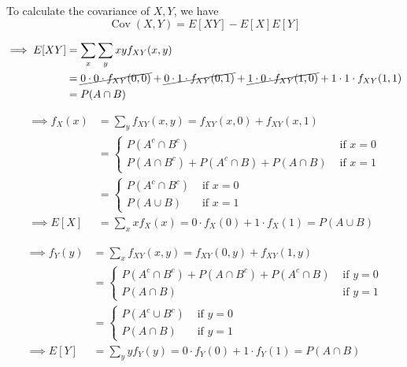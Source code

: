 To calculate the covariance of \( X, Y \), we have
\begin{equation*}
    \operatorname{Cov}(X, Y) = E[XY] - E[X]E[Y]
\end{equation*}

\begin{align*}
    \implies
    E[XY]
     & =
    \sum_{x} \sum_{y} xy f_{XY}(x, y)
    \\ & =
    \cancel{0 \cdot 0 \cdot f_{XY}(0, 0)}
    + \cancel{0 \cdot 1 \cdot f_{XY}(0, 1)}
    + \cancel{1 \cdot 0 \cdot f_{XY}(1, 0)}
    + 1 \cdot 1 \cdot f_{XY}(1, 1)
    \\ & =
    P(A \cap B)
\end{align*}

\begin{align*}
    \implies
    f_X (x)
     & =
    \sum_{y} f_{XY}(x, y)
    =
    f_{XY}(x, 0)
    + f_{XY}(x, 1)
    \\ & =
    \begin{cases}
        P(A^{c} \cap B^{c})
         &
        \text { if } x=0
        \\
        P(A \cap B^{c})
        + P(A^{c} \cap B)
        + P(A \cap B)
         &
        \text { if } x=1
    \end{cases}
    \\ & =
    \begin{cases}
        P(A^{c} \cap B^{c})
         &
        \text { if } x=0
        \\
        P(A \cup B)
         &
        \text { if } x=1
    \end{cases}
    \\
    \implies
    E[X]
     & =
    \sum_{x} x f_X(x)
    =
    0 \cdot f_X(0)
    + 1 \cdot f_X(1)
    =
    P(A \cup B)
\end{align*}

\begin{align*}
    \implies
    f_Y (y)
     & =
    \sum_{x} f_{XY}(x, y)
    =
    f_{XY}(0, y)
    + f_{XY}(1, y)
    \\ & =
    \begin{cases}
        P(A^{c} \cap B^{c})
        + P(A \cap B^{c})
        + P(A^{c} \cap B)
         &
        \text { if } y=0
        \\
        P(A \cap B)
         &
        \text { if } y=1
    \end{cases}
    \\ & =
    \begin{cases}
        P(A^{c} \cup B^{c})
         &
        \text { if } y=0
        \\
        P(A \cap B)
         &
        \text { if } y=1
    \end{cases}
    \\
    \implies
    E[Y]
     & =
    \sum_{y} y f_Y(y)
    =
    0 \cdot f_Y(0) + 1 \cdot f_Y(1)
    =
    P(A \cap B)
\end{align*}

